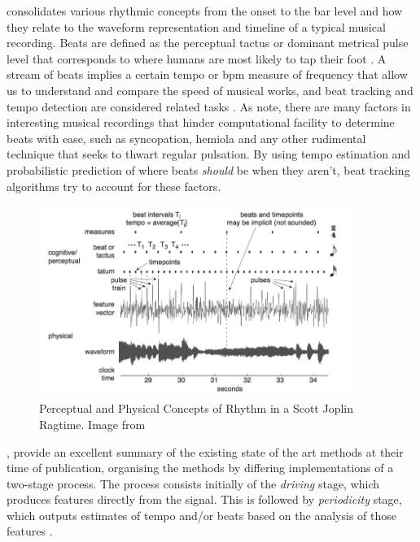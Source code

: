 { consolidates various rhythmic concepts from the onset to the bar level and how they relate to the waveform representation and timeline of a typical musical recording. Beats are defined as the perceptual tactus or dominant metrical pulse level that corresponds to where humans are most likely to tap their foot \citep{Jehan2005, Ellis2007a, Stark2009}. A stream of beats implies a certain tempo or \acrlong{bpm} measure of frequency that allow us to understand and compare the speed of musical works, and beat tracking and tempo detection are considered related tasks \citep{McKinney2007}. As \cite{Korzeniowski2014} note, there are many factors in interesting musical recordings that hinder computational facility to determine beats with ease, such as syncopation, hemiola and any other rudimental technique that seeks to thwart regular pulsation. By using tempo estimation and probabilistic prediction of where beats \textit{should} be when they aren't, beat tracking algorithms try to account for these factors. 

\begin{figure}
	\begin{center}
		\includegraphics[width=0.9\textwidth]{ch05_pyconcat/figures/joplin.png}
	\end{center}
	\caption[Perceptual and Physical Concepts of Rhythm in a Scott Joplin Ragtime]{Perceptual and Physical Concepts of Rhythm in a Scott Joplin Ragtime. Image from \cite{Sethares2007}}
	\label{fig:beat_joplin}
\end{figure}

\cite{McKinney2007}, provide an excellent summary of the existing state of the art methods at their time of publication, organising the methods by differing implementations of a two-stage process. The process consists initially of the \textit{driving} stage, which produces features directly from the signal. This is followed by \textit{periodicity} stage, which outputs estimates of tempo and/or beats based on the analysis of those features \citep{McKinney2007}.

}

